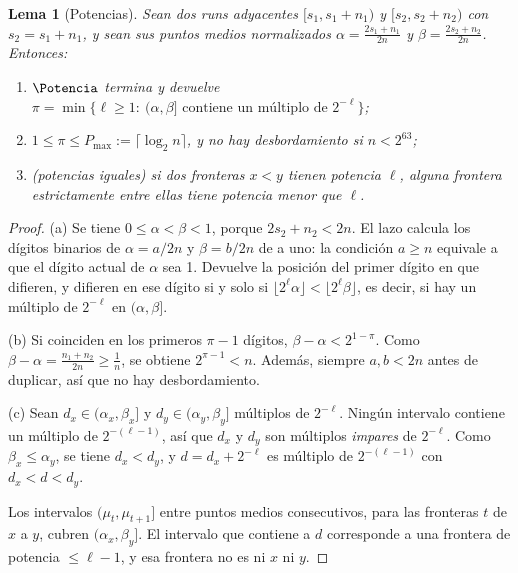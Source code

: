 \documentclass[10pt,a4paper]{article}
\theoremstyle{plain}
\newtheorem{lema}[teorema]{Lema}
\theoremstyle{definition}
\theoremstyle{remark}
\begin{document}
\begin{lema}[Potencias]\label{lem:pot}
Sean dos runs adyacentes $[s_1,s_1{+}n_1)$ y $[s_2,s_2{+}n_2)$ con $s_2=s_1+n_1$, y
sean sus puntos medios normalizados $\alpha=\frac{2s_1+n_1}{2n}$ y
$\beta=\frac{2s_2+n_2}{2n}$. Entonces:
\begin{enumerate}[label=(\alph*),nosep]
\item $\Potencia$ termina y devuelve
  $\pi=\min\{\ell\ge 1:\ (\alpha,\beta] \text{ contiene un múltiplo de } 2^{-\ell}\}$;
\item $1\le\pi\le P_{\max}:=\lceil\log_2 n\rceil$, y no hay desbordamiento si
  $n<2^{63}$;
\item \emph{(potencias iguales)} si dos fronteras $x<y$ tienen potencia $\ell$, alguna
  frontera estrictamente entre ellas tiene potencia menor que $\ell$.
\end{enumerate}
\end{lema}
\begin{proof}
(a) Se tiene $0\le\alpha<\beta<1$, porque $2s_2+n_2<2n$. El lazo calcula los dígitos
binarios de $\alpha=a/2n$ y $\beta=b/2n$ de a uno: la condición $a\ge n$ equivale a
que el dígito actual de $\alpha$ sea 1. Devuelve la posición del primer dígito en que
difieren, y difieren en ese dígito si y solo si
$\lfloor 2^\ell\alpha\rfloor<\lfloor2^\ell\beta\rfloor$, es decir, si hay un múltiplo
de $2^{-\ell}$ en $(\alpha,\beta]$.

(b) Si coinciden en los primeros $\pi-1$ dígitos, $\beta-\alpha<2^{1-\pi}$. Como
$\beta-\alpha=\frac{n_1+n_2}{2n}\ge\frac1n$, se obtiene $2^{\pi-1}<n$. Además,
siempre $a,b<2n$ antes de duplicar, así que no hay desbordamiento.

(c) Sean $d_x\in(\alpha_x,\beta_x]$ y $d_y\in(\alpha_y,\beta_y]$ múltiplos de
$2^{-\ell}$. Ningún intervalo contiene un múltiplo de $2^{-(\ell-1)}$, así que $d_x$
y $d_y$ son múltiplos \emph{impares} de $2^{-\ell}$. Como $\beta_x\le\alpha_y$, se
tiene $d_x<d_y$, y $d=d_x+2^{-\ell}$ es múltiplo de $2^{-(\ell-1)}$ con
$d_x<d<d_y$.

Los intervalos $(\mu_t,\mu_{t+1}]$ entre puntos medios consecutivos, para las
fronteras $t$ de $x$ a $y$, cubren $(\alpha_x,\beta_y]$. El intervalo que contiene a
$d$ corresponde a una frontera de potencia $\le\ell-1$, y esa frontera no es ni $x$
ni $y$.
\end{proof}
\end{document}
